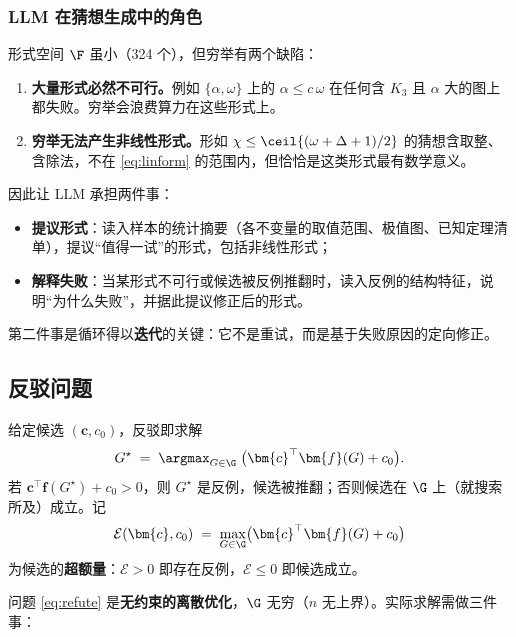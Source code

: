 \subsubsection{LLM 在猜想生成中的角色}
\label{sec:f-llm}

形式空间 $\F$ 虽小（324 个），但穷举有两个缺陷：

\begin{enumerate}[label=(\arabic*)]
  \item \textbf{大量形式必然不可行。}例如 $\{\alpha,\omega\}$ 上的 $\alpha\le c\,\omega$ 在任何含 $K_3$ 且 $\alpha$ 大的图上都失败。穷举会浪费算力在这些形式上。
  \item \textbf{穷举无法产生非线性形式。}形如 $\chi\le\ceil{(\omega+\Delta+1)/2}$ 的猜想含取整、含除法，不在 \eqref{eq:linform} 的范围内，但恰恰是这类形式最有数学意义。
\end{enumerate}

因此让 LLM 承担两件事：
\begin{itemize}
  \item \textbf{提议形式}：读入样本的统计摘要（各不变量的取值范围、极值图、已知定理清单），提议“值得一试”的形式，包括非线性形式；
  \item \textbf{解释失败}：当某形式不可行或候选被反例推翻时，读入反例的结构特征，说明“为什么失败”，并据此提议修正后的形式。
\end{itemize}

第二件事是循环得以\textbf{迭代}的关键：它不是重试，而是基于失败原因的定向修正。

\subsection{反驳问题}
\label{sec:f-refute}

给定候选 $(\bm{c},c_0)$，反驳即求解
\begin{equation}
  G^{\star} \;=\; \argmax_{G\in\G}\; \bigl(\bm{c}^{\top}\bm{f}(G)+c_0\bigr).
  \label{eq:refute}
\end{equation}
若 $\bm{c}^{\top}\bm{f}(G^{\star})+c_0>0$，则 $G^{\star}$ 是反例，候选被推翻；否则候选在 $\G$ 上（就搜索所及）成立。记
\begin{equation}
  \mathcal{E}(\bm{c},c_0) \;=\; \max_{G\in\G}\bigl(\bm{c}^{\top}\bm{f}(G)+c_0\bigr)
  \label{eq:excess}
\end{equation}
为候选的\textbf{超额量}：$\mathcal{E}>0$ 即存在反例，$\mathcal{E}\le0$ 即候选成立。

问题 \eqref{eq:refute} 是\textbf{无约束的离散优化}，$\G$ 无穷（$n$ 无上界）。实际求解需做三件事：

